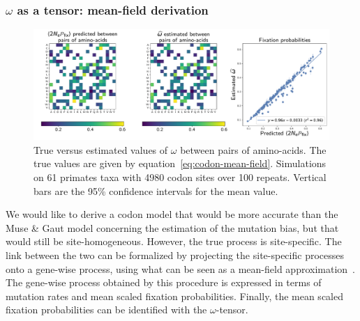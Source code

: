 \documentclass{article}
\begin{document}
\subsubsection{\texorpdfstring{$\omega$}{ω} as a tensor: mean-field derivation}

\begin{figure}[!htb]
 \centering
 \includegraphics[width=\linewidth, page=1]{inference_simulations/omega_MF}
 \caption[Estimation of fixation probability]{
  True versus estimated values of $\omega$ between pairs of amino-acids.
  The true values are given by equation~\ref{eq:codon-mean-field}.
  Simulations on 61 primates taxa with 4980 codon sites over 100 repeats.
Vertical bars are the 95\% confidence intervals for the mean value.
 }
 \label{fig:omega-inference}
\end{figure}

We would like to derive a codon model that would be more accurate than the Muse \& Gaut model concerning the estimation of the mutation bias, but that would still be site-homogeneous.
However, the true process is site-specific.
The link between the two can be formalized by projecting the site-specific processes onto a gene-wise process, using what can be seen as a mean-field approximation~\citep{Goldstein2016}.
The gene-wise process obtained by this procedure is expressed in terms of mutation rates and mean scaled fixation probabilities.
Finally, the mean scaled fixation probabilities can be identified with the $\omega$-tensor.
\end{document}
